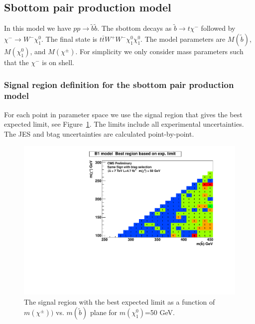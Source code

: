 

\clearpage

\subsection{Sbottom pair production model}
\label{sec:sbottompair}
In this model we have $pp \to \tilde{b}\tilde{b}$.  The sbottom decays 
as $\tilde{b} \to t\chi^{-}$ followed by $\chi^{-} \to W^- \chi_1^0$. 
The final state is $t\bar{t}W^+W^- \chi_1^0 \chi_1^0$. 
The model parameters are $M(\widetilde{b})$, $M(\chi_1^0)$, and $M(\chi^{\pm})$.
For simplicity we only consider mass parameters such that the $\chi^{-}$ is on shell.

\subsubsection{Signal region definition for the sbottom pair production model}
\label{sec:sbottompairdefinition}
For each point in parameter space we use the signal region that gives
the best expected limit, see Figure~\ref{fig:sbottomoptimize}.
The limits include all experimental 
uncertainties.   The JES and btag uncertainties are calculated point-by-point.


\begin{figure}[htb]
\begin{center}
\includegraphics[width=0.5\linewidth]{figs/B1_BestSignalRegion.pdf}
\caption{The signal region with the best expected limit as a function of 
$m(\chi^{\pm}))$ vs. $m(\widetilde{b})$ plane for $m(\chi^0_1)$=50 GeV.
\label{fig:sbottomoptimize}}
\end{center}
\end{figure}


